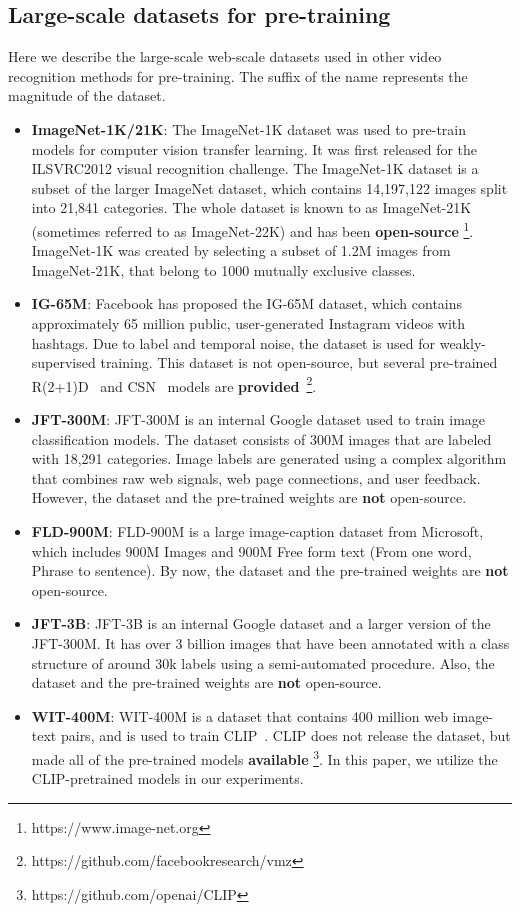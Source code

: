 \documentclass[letterpaper]{article} \usepackage{aaai23}  \usepackage{times}  \usepackage{helvet}  \usepackage{courier}  \usepackage[hyphens]{url}  \usepackage{graphicx} \urlstyle{rm} \def\UrlFont{\rm}  \usepackage{natbib}  \usepackage{caption} \frenchspacing  \setlength{\pdfpagewidth}{8.5in}  \setlength{\pdfpageheight}{11in}  \usepackage{algorithm}
\begin{document}
\subsection{Large-scale datasets for pre-training}\label{sec:large-scale}
Here we describe the large-scale web-scale datasets used in other video recognition methods for pre-training. The suffix of the name represents the magnitude of the dataset.
\begin{itemize}
    \item \textbf{ImageNet-1K/21K}: The ImageNet-1K dataset was used to pre-train models for computer vision transfer learning. It was first released for the ILSVRC2012 visual recognition challenge. The ImageNet-1K dataset is a subset of the larger ImageNet dataset, which contains 14,197,122 images split into 21,841 categories. The whole dataset is known to as ImageNet-21K (sometimes referred to as ImageNet-22K) and has been \textbf{open-source} \footnote{https://www.image-net.org}. ImageNet-1K was created by selecting a subset of 1.2M images from ImageNet-21K, that belong to 1000 mutually exclusive classes. 
    \item \textbf{IG-65M}: Facebook has proposed the IG-65M dataset, which contains approximately 65 million public, user-generated Instagram videos with hashtags. Due to label and temporal noise, the dataset is used for weakly-supervised training. This dataset is not open-source, but several pre-trained R(2+1)D~\cite{r2+1d} and CSN~\cite{CSN} models are \textbf{provided}~\footnote{https://github.com/facebookresearch/vmz}.
    \item \textbf{JFT-300M}: JFT-300M is an internal Google dataset used to train image classification models. The dataset consists of 300M images that are labeled with 18,291 categories. Image labels are generated using a complex algorithm that combines raw web signals, web page connections, and user feedback. However, the dataset and the pre-trained weights are \textbf{not} open-source.
    \item \textbf{FLD-900M}: FLD-900M is a large image-caption dataset from Microsoft, which includes 900M Images and 900M Free form text (From one word, Phrase to sentence). By now, the dataset and the pre-trained weights are \textbf{not} open-source.
    \item \textbf{JFT-3B}: JFT-3B is an internal Google dataset and a larger version of the JFT-300M. It has over 3 billion images that have been annotated with a class structure of around 30k labels using a semi-automated procedure. Also, the dataset and the pre-trained weights are \textbf{not} open-source.
    \item \textbf{WIT-400M}: WIT-400M is a dataset that contains 400 million web image-text pairs, and is used to train CLIP~\cite{CLIP}. CLIP does not release the dataset, but made all of the pre-trained models \textbf{available} \footnote{https://github.com/openai/CLIP}.
    In this paper, we utilize the CLIP-pretrained models in our experiments.
\end{itemize}
\end{document}
